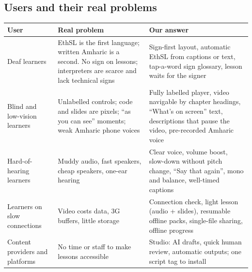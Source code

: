 \documentclass[11pt,a4paper]{article}
\begin{document}
\subsection{Users and their real problems}
\begin{xltabular}{\textwidth}{@{}>{\raggedright\arraybackslash}p{2.6cm} X X@{}}
\toprule
\textbf{User} & \textbf{Real problem} & \textbf{Our answer} \\
\midrule
\endhead
Deaf learners & EthSL is the first language; written Amharic is a second. No sign on lessons; interpreters are scarce and lack technical signs & Sign-first layout, automatic EthSL from captions or text, tap-a-word sign glossary, lesson waits for the signer \\
Blind and low-vision learners & Unlabelled controls; code and slides are pixels; ``as you can see'' moments; weak Amharic phone voices & Fully labelled player, video navigable by chapter headings, ``What's on screen'' text, descriptions that pause the video, pre-recorded Amharic voice \\
Hard-of-hearing learners & Muddy audio, fast speakers, cheap speakers, one-ear hearing & Clear voice, volume boost, slow-down without pitch change, ``Say that again'', mono and balance, well-timed captions \\
Learners on slow connections & Video costs data, 3G buffers, little storage & Connection check, light lesson (audio + slides), resumable offline packs, single-file sharing, offline progress \\
Content providers and platforms & No time or staff to make lessons accessible & Studio: AI drafts, quick human review, automatic outputs; one script tag to install \\
\bottomrule
\end{xltabular}
\end{document}
